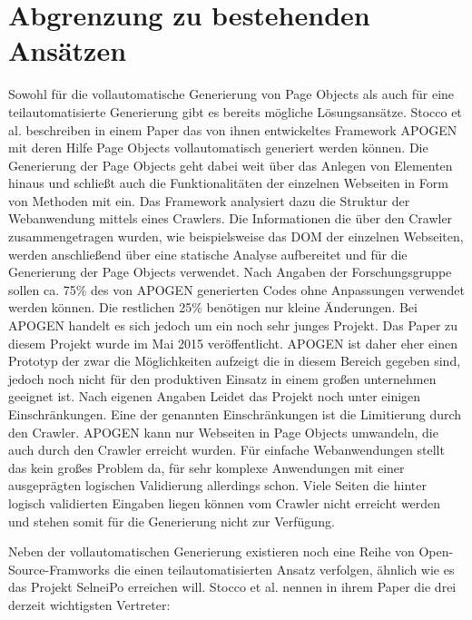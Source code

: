 \section{Abgrenzung zu bestehenden Ansätzen}
\label{sec:abgrenzung_zu_bestehenden_ansaetzen}
Sowohl für die vollautomatische Generierung von Page Objects als auch für eine teilautomatisierte Generierung gibt es bereits mögliche Lösungsansätze. 
Stocco et al. \cite{stocco_why_2015} beschreiben in einem Paper das von ihnen entwickeltes Framework APOGEN mit deren Hilfe Page Objects vollautomatisch generiert werden können. Die Generierung der Page Objects geht dabei weit über das Anlegen von Elementen hinaus und schließt auch die Funktionalitäten der einzelnen Webseiten in Form von Methoden mit ein.
Das Framework analysiert dazu die Struktur der Webanwendung mittels eines Crawlers. Die Informationen die über den Crawler zusammengetragen wurden, wie beispielsweise das DOM der einzelnen Webseiten, werden anschließend über eine statische Analyse aufbereitet und für die Generierung der Page Objects verwendet.
Nach Angaben der Forschungsgruppe sollen ca. 75\% des von APOGEN generierten Codes ohne Anpassungen verwendet werden können. Die restlichen 25\% benötigen nur kleine Änderungen.
Bei APOGEN handelt es sich jedoch um ein noch sehr junges Projekt. Das Paper zu diesem Projekt wurde im Mai 2015 veröffentlicht. APOGEN ist daher eher einen Prototyp der zwar die Möglichkeiten aufzeigt die in diesem Bereich gegeben sind, jedoch noch nicht für den produktiven Einsatz in einem großen unternehmen geeignet ist.
Nach eigenen Angaben Leidet das Projekt noch unter einigen Einschränkungen. Eine der genannten Einschränkungen ist die Limitierung durch den Crawler.
APOGEN kann nur Webseiten in Page Objects umwandeln, die auch durch den Crawler erreicht wurden.
Für einfache Webanwendungen stellt das kein großes Problem da, für sehr komplexe Anwendungen mit einer ausgeprägten logischen Validierung allerdings schon.
Viele Seiten die hinter logisch validierten Eingaben liegen können vom Crawler nicht erreicht werden und stehen somit für die Generierung nicht zur Verfügung.\

Neben der vollautomatischen Generierung existieren noch eine Reihe von Open-Source-Framworks 
die einen teilautomatisierten Ansatz verfolgen, ähnlich wie es das Projekt SelneiPo erreichen will.
Stocco et al. \cite{stocco_why_2015} nennen in ihrem Paper die drei derzeit wichtigsten Vertreter:

